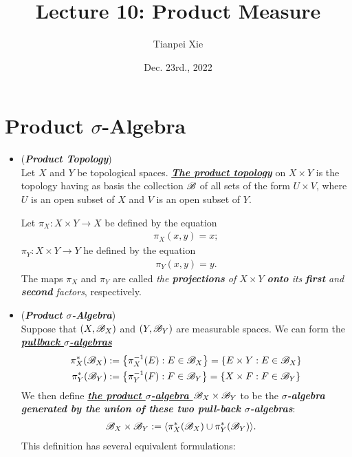 \documentclass[11pt]{article}
\begin{document}
\title{Lecture 10: Product Measure}
\author{ Tianpei Xie}
\date{Dec. 23rd., 2022}
\maketitle
\tableofcontents
\newpage
\section{Product $\sigma$-Algebra}
\begin{itemize}
\item \begin{definition} (\emph{\textbf{Product Topology}})\\
Let $X$ and $Y$ be topological spaces. \underline{\emph{\textbf{The product topology}}} on $X \times Y$ is the topology having as basis the collection ${\mathscr B}$ of all sets of the form $U \times V$, where $U$ is an open subset of $X$ and $V$ is an open subset of $Y$.
\end{definition}

\begin{definition}
Let $\pi_X : X \times Y \rightarrow X$ be defined by the equation
\begin{align*}
\pi_X (x, y) = x;
\end{align*}
$\pi_Y : X \times Y \rightarrow Y$ he defined by the equation
\begin{align*}
\pi_Y (x, y) = y.
\end{align*}
The maps $\pi_X$ and $\pi_Y$ are called \emph{the \textbf{projections} of $X \times Y$ \textbf{onto} its \textbf{first} and \textbf{second} factors}, respectively.
\end{definition} 

\item \begin{definition} (\emph{\textbf{Product $\sigma$-Algebra}})\\
Suppose that $(X, {\mathscr B}_X)$ and $(Y, {\mathscr B}_Y)$ are measurable spaces. We can form the \underline{\emph{\textbf{pullback $\sigma$-algebras}}}
\begin{align*}
\pi_{X}^{*}({\mathscr B}_X) & := \left\{\pi_{X}^{-1}(E): E \in {\mathscr B}_X\right\} = \left\{E \times Y: E \in {\mathscr B}_X\right\}\\
\pi_{Y}^{*}({\mathscr B}_Y) & := \left\{\pi_{Y}^{-1}(F): F \in {\mathscr B}_Y\right\} = \left\{X \times F: F \in {\mathscr B}_Y\right\}
\end{align*}
We then define \underline{\emph{\textbf{the product $\sigma$-algebra ${\mathscr B}_X \times {\mathscr B}_Y$}}} to be the \emph{\textbf{$\sigma$-algebra} \textbf{generated by the union of these two pull-back $\sigma$-algebras}}:
\begin{align*}
{\mathscr B}_X \times {\mathscr B}_Y &:= \langle  \pi_{X}^{*}({\mathscr B}_X)  \cup  \pi_{Y}^{*}({\mathscr B}_Y)   \rangle.
\end{align*}
This definition has several equivalent formulations:
\end{definition}


\end{itemize}
\end{document}
